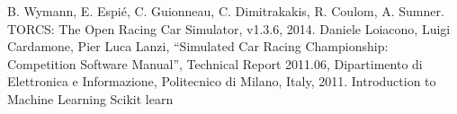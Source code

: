 \documentclass[declaration,shortabstract,english,inz]{iithesis}
\begin{document}

\begin{thebibliography}{1}
 B. Wymann, E. Espié, C. Guionneau, C. Dimitrakakis, R. Coulom, A. Sumner. TORCS: The Open Racing Car Simulator, v1.3.6, 2014.
 Daniele Loiacono, Luigi Cardamone, Pier Luca Lanzi, “Simulated Car
Racing Championship: Competition Software Manual”, Technical Report 2011.06, Dipartimento
di Elettronica e Informazione, Politecnico di Milano, Italy, 2011.
 Introduction to Machine Learning
 Scikit learn

\end{thebibliography}
\end{document}
